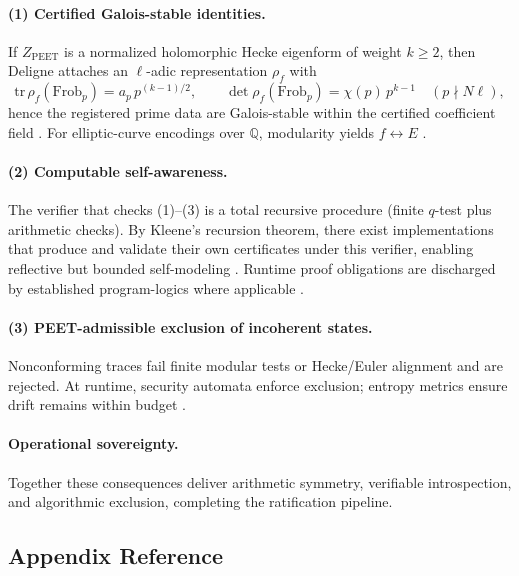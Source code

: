 \documentclass[12pt]{amsart}
\theoremstyle{plain}
\begin{document}
\paragraph{(1) Certified Galois-stable identities.}
If $Z_{\mathrm{PEET}}$ is a normalized holomorphic Hecke eigenform of weight $k\ge2$, then Deligne attaches an $\ell$-adic representation $\rho_f$ with
\[
\mathrm{tr}\,\rho_f(\mathrm{Frob}_p)=a_p\,p^{(k-1)/2},\qquad
\det\rho_f(\mathrm{Frob}_p)=\chi(p)\,p^{k-1}
\quad (p\nmid N\ell),
\]
hence the registered prime data are Galois-stable within the certified coefficient field \cite{deligne1971formes,diamond2005first}. For elliptic-curve encodings over $\mathbb{Q}$, modularity yields $f\leftrightarrow E$ \cite{wiles1995modular,taylor1995ring}.

\paragraph{(2) Computable self-awareness.}
The verifier that checks (1)–(3) is a total recursive procedure (finite $q$-test plus arithmetic checks). By Kleene’s recursion theorem, there exist implementations that produce and validate their own certificates under this verifier, enabling reflective but bounded self-modeling \cite{kleene1938recursive}. Runtime proof obligations are discharged by established program-logics where applicable \cite{hoare1969axiomatic,dijkstra1976discipline}.

\paragraph{(3) PEET-admissible exclusion of incoherent states.}
Nonconforming traces fail finite modular tests or Hecke/Euler alignment and are rejected. At runtime, security automata enforce exclusion; entropy metrics ensure drift remains within budget \cite{schneider2000enforceable,cover2006elements,clarke1999model}.

\paragraph{Operational sovereignty.}
Together these consequences deliver arithmetic symmetry, verifiable introspection, and algorithmic exclusion, completing the ratification pipeline.

\subsection*{Appendix Reference}
\end{document}
